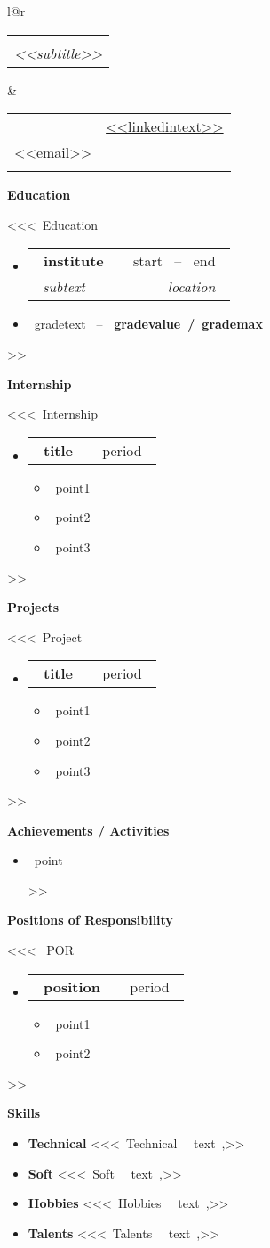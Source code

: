 \documentclass[letterpaper,12pt]{article}[leftmargin=*]
\makeatletter
\def \fullname {<<name>>}
\def \subtitle {<<subtitle>>}
\def \linkedinicon {\faLinkedin}
\def \linkedinlink {<<linkedin>>}
\def \linkedintext {<<linkedintext>>}
\def \phoneicon {\faPhone}
\def \phonetext {<<phone>>}
\def \emailicon {\faEnvelope}
\def \emaillink {mailto:<<email>>}
\def \emailtext {<<email>>}
\def \headertype {\doublecol} %
\def \entryspacing {-0pt}
\def \linkedin {\linkedinicon \hspace{3pt}\href{\linkedinlink}{\linkedintext}}
\def \phone {\phoneicon \hspace{3pt}{ \phonetext}}
\def \email {\emailicon \hspace{3pt}\href{\emaillink}{\emailtext}}
\renewcommand{\section}[2]{\vspace{5pt}
  \colorbox{secondary}{\color{white}\raggedbottom\normalsize\textbf{{#1}{\hspace{7pt}#2}}}
}
\newcommand{\resumeEntryStart}{\begin{itemize}[leftmargin=2.5mm]}
\newcommand{\resumeEntryEnd}{\end{itemize}\vspace{\entryspacing}}
\newcommand{\resumeItemListStart}{\begin{itemize}[leftmargin=4.5mm]}
\newcommand{\resumeItemListEnd}{\end{itemize}}
\newcommand{\resumeItem}[1]{
  \item\small{
    {#1 \vspace{-2pt}}
  }
}
\newcommand{\resumeEntryTSDL}[4]{
  \vspace{-1pt}\item[]
    \begin{tabular*}{0.97\textwidth}{l@{\extracolsep{\fill}}r}
      \textbf{\color{primary}#1} & {\firabook\color{accent}\small#2} \\
      \textit{\color{accent}\small#3} & \textit{\color{accent}\small#4} \\
    \end{tabular*}\vspace{-6pt}
}
\newcommand{\resumeEntryTD}[2]{
  \vspace{-1pt}\item[]
    \begin{tabular*}{0.97\textwidth}{l@{\extracolsep{\fill}}r}
      \textbf{\color{primary}#1} & {\firabook\color{accent}\small#2} \\
    \end{tabular*}\vspace{-6pt}
}
\newcommand{\resumeEntryS}[2]{
  \item[]\small{
    \textbf{\color{primary}#1 }{ #2 \vspace{-6pt}}
  }
}
\newcommand{\doublecol}[6]{
  \begin{tabular*}{\textwidth}{l@{\extracolsep{\fill}}r}
    {
      \begin{tabular}[c]{l}
        \fontsize{35}{45}\selectfont{\color{primary}{{\textbf{\fullname}}}} \\
        {\textit{\subtitle}} %
      \end{tabular}
    } & {
      \begin{tabular}[c]{l@{\hspace{1.5em}}l}
        {\small#4} & {\small#1} \\
        {\small#5} & {\small#2} \\
        {\small#6} & {\small#3}
      \end{tabular}
    }
  \end{tabular*}
}
\newcommand{\singlecol}[6]{
  \begin{tabular*}{\textwidth}{l@{\extracolsep{\fill}}r}
    {
      \begin{tabular}[b]{l}
        \fontsize{35}{45}\selectfont{\color{primary}{{\textbf{\fullname}}}} \\
        {\textit{\subtitle}} %
      \end{tabular}
    } & {
      \begin{tabular}[c]{l}
        {\small#1} \\
        {\small#2} \\
        {\small#3} \\
        {\small#4} \\
        {\small#5} \\
        {\small#6}
      \end{tabular}
    }
  \end{tabular*}
}
\makeatother
\begin{document}
\headertype{\linkedin}{}{}{\phone}{\email}{} %
\vspace{3pt} %

\section{\faGraduationCap}{Education}
<<<~Education~
\resumeEntryStart
  \resumeEntryTSDL
      {~institute~}{~start~ -- ~end~}
      {~subtext~}{~location~}
     \item[]\small{\color{primary}~gradetext~ -- { \textbf{~gradevalue~/~grademax~} \vspace{-6pt}}}
  \resumeEntryEnd
  \vspace{3pt}
>>

  \vspace{4pt}
  
\section{\faTrophy}{Internship}
<<<~Internship~
  \resumeEntryStart
      \resumeEntryTD
      {~title~}{~period~}
    \resumeItemListStart
      \resumeItem{~point1~}
      \resumeItem{~point2~}
      \resumeItem{~point3~}
    \resumeItemListEnd
  \resumeEntryEnd
>>  

\section{\faTrophy}{Projects}
<<<~Project~
\resumeEntryStart
      \resumeEntryTD
      {~title~}{~period~}
    \resumeItemListStart
      \resumeItem {~point1~}
      \resumeItem {~point2~}
      \resumeItem {~point3~}
    \resumeItemListEnd
  \resumeEntryEnd
>>
  

\section{\faFlag}{Achievements / Activities}
\resumeEntryStart
<<<~Achievement~  \resumeItem {~point~}
  \vspace{-4pt}
>> 
  \resumeEntryEnd
  
  
\section{\faPieChart}{Positions of Responsibility}
  \vspace{3pt}
<<< ~POR~
  \resumeEntryStart
      \resumeEntryTD
      {~position~}{~period~}
    \resumeItemListStart
      \resumeItem {~point1~}
      \resumeItem {~point2~}
    \resumeItemListEnd
  \resumeEntryEnd
>>

  
\section{\faGears}{Skills}
 \resumeEntryStart
 \resumeEntryS{Technical} {<<<~Technical~ ~text~,>>}
  \vspace{4pt}
  \resumeEntryS{Soft}{<<<~Soft~ ~text~,>>}
  \vspace{4pt}
  \resumeEntryS{Hobbies} {<<<~Hobbies~ ~text~,>>}
  \vspace{4pt}
  \resumeEntryS{Talents} {<<<~Talents~ ~text~,>>}
 \resumeEntryEnd
\end{document}
